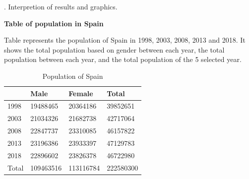 \documentclass[12pt, oneside]{report}\usepackage[]{graphicx}\usepackage[]{color}
\begin{document}
. Interpretion of results and graphics. \\

\begin{center}
\textbf {Table of population in Spain} \\
\end{center}
Table represents the population of Spain in 1998, 2003, 2008, 2013 and 2018. It shows the total population based on gender between each year, the total population between each year, and the total population of the 5 selected year.

\begin{table}[ht]
\centering
\begingroup\large
\begin{tabular}{|l|l|l|l|}
  \hline
 & Male & Female & Total \\ 
  \hline
1998 & 19488465 & 20364186 & 39852651 \\ 
  2003 & 21034326 & 21682738 & 42717064 \\ 
  2008 & 22847737 & 23310085 & 46157822 \\ 
  2013 & 23196386 & 23933397 & 47129783 \\ 
  2018 & 22896602 & 23826378 & 46722980 \\ 
  Total & 109463516 & 113116784 & 222580300 \\ 
   \hline
\end{tabular}
\endgroup
\caption{Population of Spain} 
\end{table}
\end{document}
